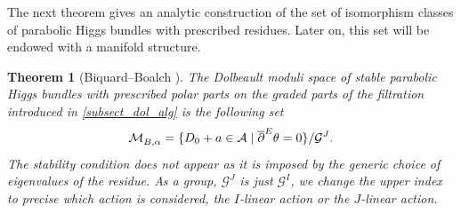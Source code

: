 \documentclass[JEP,XML,SOM,NoEqCountersInSection,Unicode,published]{cedram}
\newcommand{\NoChangel}[1]{%
\expandafter\let\csname old\string#1\endcsname=#1
\let#1=\relax
\newcommand{#1}{\mathcode`l="716C\csname old\string#1\endcsname\mathcode`l="7160 }%
}
\newcommand{\Dol}{\mathrm{Dol}}\NoChangel{\Dol}
\theoremstyle{definition}
\theoremstyle{plain}
\newtheorem{theorem}[definition]{Theorem}
\begin{document}
The next theorem gives an analytic construction of the set of isomorphism classes of parabolic Higgs bundles with prescribed residues.
Later on, this set will be endowed with a manifold structure.
\begin{theorem}[Biquard--Boalch {\cite[\S7]{Biquard_Boalch_2004}}]
The Dolbeault moduli space of stable parabolic Higgs bundles with prescribed polar parts on the graded parts of the filtration introduced in \ref{subsect_dol_alg} is the following set
\[
\mathcal{M}^{\Dol}_{B, \alpha} =\lbrace D_0 + a \in \mathcal{A} \mid \overline{\partial}^E \theta =0\rbrace/ \mathcal{G}^{J}.
\]
The stability condition does not appear as it is imposed by the generic choice of eigenvalues of the residue. As a group, $\mathcal{G}^J$ is just $\mathcal{G}^I$, we change the upper index to precise which action is considered, the $I$-linear action or the $J$-linear action.
\end{theorem}
\end{document}
